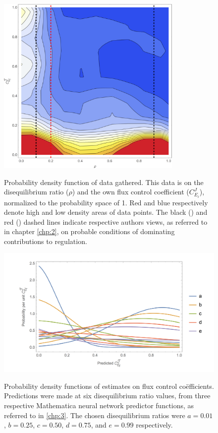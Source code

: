 \begin{figure}[p] 
\includegraphics[width=0.8\textwidth]{figs/LitCompare.png} \label{LitCompare}
\centering
\caption{Probability density function of data gathered. This data is on the disequilibrium ratio ($\rho$) and the own flux control coefficient ($C_{E_i}^J$), normalized to the probability space of 1. Red and blue respectively denote high and low density areas of data points. The black (\citeauthor{Rohwer2009}) and red (\citeauthor{ROLLESTON1972}) dashed lines indicate respective authors views, as referred to in chapter \ref{chp:2}, on probable conditions of dominating contributions to regulation.}

\includegraphics[width=1\textwidth]{figs/PredConf.png} \label{PredictionConfidence}
\centering
\caption{Probability density functions of estimates on flux control co\"efficients. Predictions were made at six disequilibrium ratio values, from three respective Mathematica neural network predictor functions, as referred to in \ref{chp:3}. The chosen disequilibrium ratios were $a = 0.01$, $b = 0.25$, $c = 0.50$, $d = 0.75$, and $e = 0.99$ respectively.}
\end{figure}


